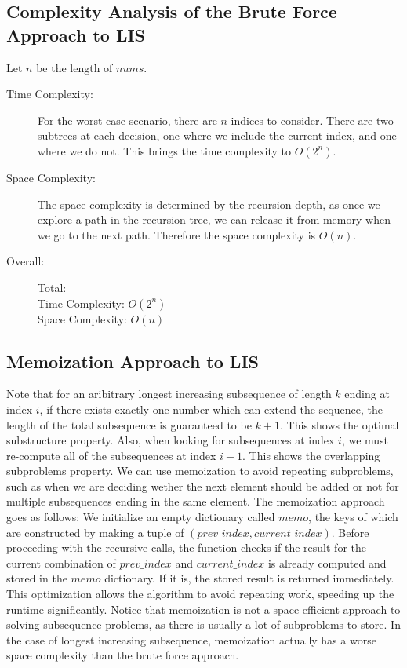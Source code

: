 \subsection{Complexity Analysis of the Brute Force Approach to LIS}
Let $n$ be the length of $nums$.
\begin{description}
    \item[Time Complexity:]
        For the worst case scenario, there are $n$ indices to consider.
        There are two subtrees at each decision, one where we include the current index, and one where we do not.
        This brings the time complexity to $O(2^n)$.
        
    \item[Space Complexity:] 
        The space complexity is determined by the recursion depth,
        as once we explore a path in the recursion tree, we can release it from memory when we go to the next path.
        Therefore the space complexity is $O(n)$.
        
        
    \item[Overall:] Total:\\
        Time Complexity: $O(2^n)$\\
        Space Complexity: $O(n)$
        

\end{description}


\subsection{Memoization Approach to LIS}

Note that for an aribitrary longest increasing subsequence of length $k$ ending at index $i$,
if there exists exactly one number which can extend the sequence, the length of the total subsequence is guaranteed to be $k+1$.
This shows the optimal substructure property.
Also, when looking for subsequences at index $i$,
we must re-compute all of the subsequences at index $i-1$.
This shows the overlapping subproblems property.
We can use memoization to avoid repeating subproblems, such as when we are deciding wether the next element should be added or not for multiple subsequences ending in the same element.
The memoization approach goes as follows:
We initialize an empty dictionary called $memo$,
the keys of which are constructed by making a tuple of $(prev\_index, current\_index)$.
Before proceeding with the recursive calls, the function checks if the result for the current combination of $prev\_index$ and $current\_index$ is already computed and stored in the $memo$ dictionary.
If it is, the stored result is returned immediately.
This optimization allows the algorithm to avoid repeating work,
speeding up the runtime significantly.
Notice that memoization is not a space efficient approach to solving subsequence problems, as there is usually a lot of subproblems to store. In the case of longest increasing subsequence, memoization actually has a worse space complexity than the brute force approach.


